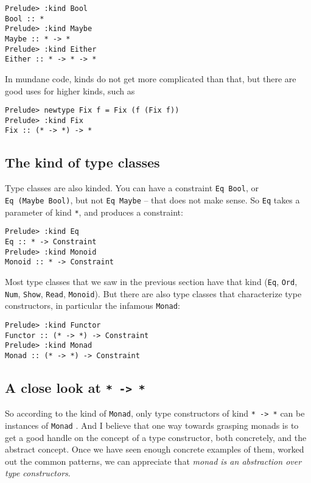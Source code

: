 \documentclass[11pt,
  american,
  DIV13]{article}
\begin{document}
\begin{verbatim}
Prelude> :kind Bool
Bool :: *
Prelude> :kind Maybe
Maybe :: * -> *
Prelude> :kind Either
Either :: * -> * -> *
\end{verbatim}

In mundane code, kinds do not get more complicated than that, but there
are good uses for higher kinds, such as

\begin{verbatim}
Prelude> newtype Fix f = Fix (f (Fix f))
Prelude> :kind Fix
Fix :: (* -> *) -> *
\end{verbatim}

\hypertarget{the-kind-of-type-classes}{%
\subsection{The kind of type classes}\label{the-kind-of-type-classes}}

Type classes are also kinded. You can have a constraint
\texttt{Eq\ Bool}, or \texttt{Eq\ (Maybe\ Bool)}, but not
\texttt{Eq\ Maybe} -- that does not make sense. So \texttt{Eq} takes a
parameter of kind \texttt{*}, and produces a constraint:

\begin{verbatim}
Prelude> :kind Eq
Eq :: * -> Constraint
Prelude> :kind Monoid
Monoid :: * -> Constraint
\end{verbatim}

Most type classes that we saw in the previous section have that kind
(\texttt{Eq}, \texttt{Ord}, \texttt{Num}, \texttt{Show}, \texttt{Read},
\texttt{Monoid}). But there are also type classes that characterize type
constructors, in particular the infamous \texttt{Monad}:

\begin{verbatim}
Prelude> :kind Functor
Functor :: (* -> *) -> Constraint
Prelude> :kind Monad
Monad :: (* -> *) -> Constraint
\end{verbatim}

\hypertarget{a-close-look-at--}{%
\subsection{\texorpdfstring{A close look at
\texttt{*\ -\textgreater{}\ *}}{A close look at * -\textgreater{} *}}\label{a-close-look-at--}}

So according to the kind of \texttt{Monad}, only type constructors of
kind \texttt{*\ -\textgreater{}\ *} can be instances of \texttt{Monad} .
And I believe that one way towards grasping monads is to get a good
handle on the concept of a type constructor, both concretely, and the
abstract concept. Once we have seen enough concrete examples of them,
worked out the common patterns, we can appreciate that \emph{monad is an
abstraction over type constructors}.
\end{document}
